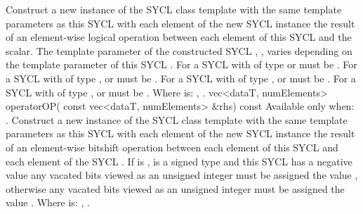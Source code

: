   {
    Construct a new instance of the SYCL  class template with the same template parameters as this SYCL  with each element of the new SYCL  instance the result of an element-wise  logical operation between each element of this SYCL  and the  scalar.
    \newline \newline
    The  template parameter of the constructed SYCL , , varies depending on the  template parameter of this SYCL . For a SYCL  with  of type  or   must be . For a SYCL  with  of type ,  or   must be . For a SYCL  with  of type ,  or   must be . For a SYCL  with  of type ,  or   must be .
    \newline \newline
    Where  is: \codeinline{\&\&}, \codeinline{\|\|}.
  }
  \addRowTwoL
  {vec<dataT, numElements> operatorOP(}
  {  const vec<dataT, numElements> \&rhs) const}
  {
    Available only when: .
    \newline
    Construct a new instance of the SYCL  class template with the same template parameters as this SYCL  with each element of the new SYCL  instance the result of an element-wise  bitshift operation between each element of this SYCL  and each element of the  SYCL . If  is \codeinline{>>},  is a signed type and this SYCL  has a negative value any vacated bits viewed as an unsigned integer must be assigned the value , otherwise any vacated bits viewed as an unsigned integer must be assigned the value .
    \newline \newline
    Where  is: \codeinline{<<}, \codeinline{>>}.
  }
